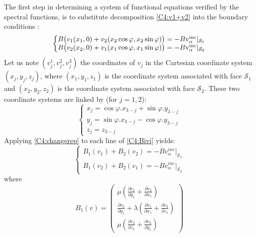 The first step in determining a system of functional equations verified by the spectral functions, is to substitute decomposition \eqref{C4:v1+v2} into the boundary conditions :
\begin{equation}
\left\{
\begin{matrix}
B \big( v_1(x_1,0)+v_2(x_2 \cos \varphi, x_2 \sin \varphi) \big) = -B \rm v_{\alpha}^{inc}|_{\mathcal{S}_1} \\
B \big( v_2(x_2,0)+v_1(x_1 \cos \varphi, x_1 \sin \varphi) \big) = -B \rm v_{\alpha}^{inc}|_{\mathcal{S}_2}
\end{matrix}
\right.
\label{C4:Bivi}
\end{equation}
Let us note $(v_j^1,v_j^2,v_j^3)$ the coordinates of $v_j$ in the Cartesian coordinate system $(x_j,y_j,z_j)$, where $(x_1,y_1,z_1)$ is the coordinate system associated with face $\mathcal{S}_1$ and $(x_2,y_2,z_2)$ is the coordinate system associated with face $\mathcal{S}_2$. These two coordinate systems are linked by (for $j=1,2$):
\begin{equation}
    \left\{
    \begin{matrix}
    x_j=\cos\varphi .x_{3-j}+\sin\varphi. y_{3-j}\\
    y_j=\sin\varphi .x_{3-j}-\cos\varphi .y_{3-j}\\
    z_j=z_{3-j}
    \end{matrix}
    \right.
    \label{C4:changerep}
\end{equation}
Applying \eqref{C4:changerep} to each line of \eqref{C4:Bivi} yields: 
\begin{equation}
\left\{
\begin{matrix}
B_1(v_1)+B_2(v_2)=-Bv_{\alpha}^{inc}|_{\mathcal{S}_1} \\
B_1(v_2)+B_2(v_1)=-Bv_{\alpha}^{inc}|_{\mathcal{S}_2}
\end{matrix}
\right.
\label{C4:b1v1+b2v2}
\end{equation}
where
\begin{equation}
B_1(v)=
\begin{pmatrix}
\mu \left( \frac{\partial v_1}{\partial y_1}+\frac{\partial v_2}{\partial x_1} \right) \\
\frac{\partial v_2}{\partial y_1}+\lambda \left( \frac{\partial v_1}{\partial x_1}+\frac{\partial v_3}{\partial z_1} \right)\\
\mu \left( \frac{\partial v_2}{\partial z_1}+ \frac{\partial v_3}{\partial y_1}\right)
\end{pmatrix}
\label{C4:B1v1expl}
\end{equation}
